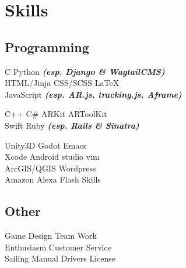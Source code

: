 \documentclass[a4paper]{deedy-resume} %
\begin{document}
\begin{minipage}[t]{0.33\textwidth}

  \sectionspace
  \section{Skills}

  \subsection{Programming}
  \textbullet{} C \textbullet{} Python {\footnotesize \textit{\textbf{(esp. Django \& WagtailCMS)}}} \\
  \textbullet{} HTML/Jinja \textbullet{} CSS/SCSS \textbullet{} \LaTeX\ \\
   \textbullet{} JavaScript {\footnotesize \textit{\textbf{(esp. AR.js, tracking.js, Aframe)}}} \\

  \sectionspace

  \textbullet{} C++ \textbullet{} C\# \textbullet{} ARKit \textbullet{} ARToolKit \\
  \textbullet{} Swift \textbullet{} Ruby {\footnotesize \textit{\textbf{(esp. Rails \& Sinatra)}}} \\

  \sectionspace

  \textbullet{} Unity3D \textbullet{} Godot \textbullet{} Emacs \\
  \textbullet{} Xcode \textbullet{} Android studio \textbullet{} vim \\
  \textbullet{} ArcGIS/QGIS \textbullet{} Wordpress \\
  \textbullet{} Amazon Alexa Flash Skills\\

  \sectionspace

  \subsection{Other}
  Game Design \textbullet{} Team Work \\
  \textbullet{} Enthusiasm \textbullet{} Customer Service \\
  \textbullet{} Sailing \textbullet{} Manual Drivers License\\

  \sectionspace


\end{minipage}
\end{document}
